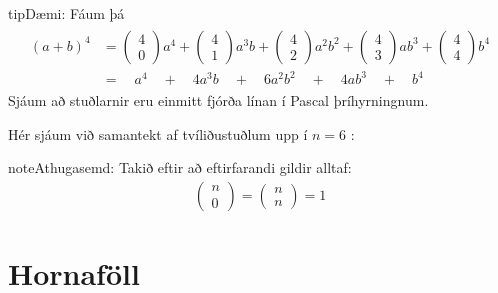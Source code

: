 \documentclass[a4paper,10pt,icelandic]{sphinxmanual}
\begin{document}
\begin{sphinxadmonition}{tip}{Dæmi:}
Fáum þá
\begin{equation*}
\begin{split}\begin{aligned}
(a + b)^4 &= \begin{pmatrix} 4 \\ 0 \end{pmatrix} a^4  + \begin{pmatrix} 4 \\ 1 \end{pmatrix} a^3b  + \begin{pmatrix} 4 \\ 2 \end{pmatrix}a^2b^2  + \begin{pmatrix} 4 \\ 3 \end{pmatrix} ab^3  + \begin{pmatrix} 4 \\ 4 \end{pmatrix} b^4 \\
&= \quad a^4 \quad +\quad 4 a^3b \quad + \quad 6 a^2b^2 \quad + \quad 4 ab^3 \quad + \quad b^4
\end{aligned}\end{split}
\end{equation*}
Sjáum að stuðlarnir eru einmitt fjórða línan í Pascal þríhyrningnum.
\end{sphinxadmonition}

Hér sjáum við samantekt af tvíliðustuðlum upp í \(n=6\) :


\begin{sphinxadmonition}{note}{Athugasemd:}
Takið eftir að eftirfarandi gildir alltaf:
\begin{equation*}
\begin{split}\begin{pmatrix} n \\ 0 \end{pmatrix} = \begin{pmatrix} n \\ n \end{pmatrix} = 1\end{split}
\end{equation*}\end{sphinxadmonition}


\chapter{Hornaföll}
\label{\detokenize{Kafli07:hornafoll}}\label{\detokenize{Kafli07::doc}}
\end{document}
